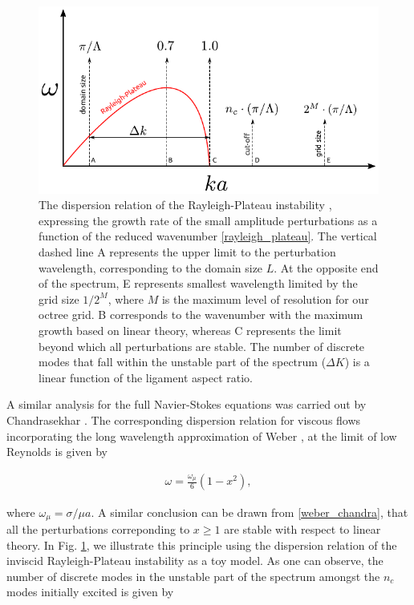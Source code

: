 \begin{figure}
\centering
\includegraphics{plots/ligament_breakup/wave_quant.pdf}
\caption{ The dispersion relation of the Rayleigh-Plateau instability 
	\cite{rayleigh1879a, plateau1849}, expressing the growth rate of 
	the small amplitude perturbations as a function of 
	the reduced wavenumber \eqref{rayleigh_plateau}.
	The vertical dashed line A represents the upper limit
	to the perturbation wavelength, corresponding to the domain size $L$. 
	At the opposite end of the spectrum, E represents smallest wavelength  
        limited by the grid size $1/2^M$, where $M$ is the maximum level of 
	resolution for our octree grid. B corresponds to the wavenumber with 
	the maximum growth based on linear theory, whereas C represents the limit
	beyond which all perturbations are stable. The number of discrete modes
	that fall within the unstable part of the spectrum ($\Delta K$) 
	is a linear function of the ligament aspect ratio. 
	}
\label{quant}
\end{figure}

A similar analysis for the full Navier-Stokes equations 
was carried out by Chandrasekhar \cite{chandra}. 
The corresponding dispersion relation for viscous 
flows incorporating the long wavelength approximation 
of Weber \cite{weber1931}, at the limit of low Reynolds is given by

\begin{align}
\omega = \frac{\omega_\mu}{6}\left(1 - x^2 \right) , 
\label{weber_chandra}
\end{align}

where $\omega_\mu = \sigma / \mu a $. 
A similar conclusion can be drawn from \eqref{weber_chandra},
that all the perturbations correponding to $x \geq 1 $ are 
stable with respect to linear theory. 
In Fig. \ref{quant}, we illustrate this principle using the dispersion 
relation of the inviscid Rayleigh-Plateau instability as a toy model. 
As one can observe, the number of discrete modes in the unstable part
of the spectrum amongst the $n_c$ modes initially excited is given by 

